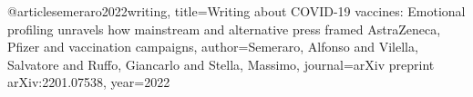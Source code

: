 @article{semeraro2022writing,
  title={Writing about COVID-19 vaccines: Emotional profiling unravels how mainstream and alternative press framed AstraZeneca, Pfizer and vaccination campaigns},
  author={Semeraro, Alfonso and Vilella, Salvatore and Ruffo, Giancarlo and Stella, Massimo},
  journal={arXiv preprint arXiv:2201.07538},
  year={2022}
}